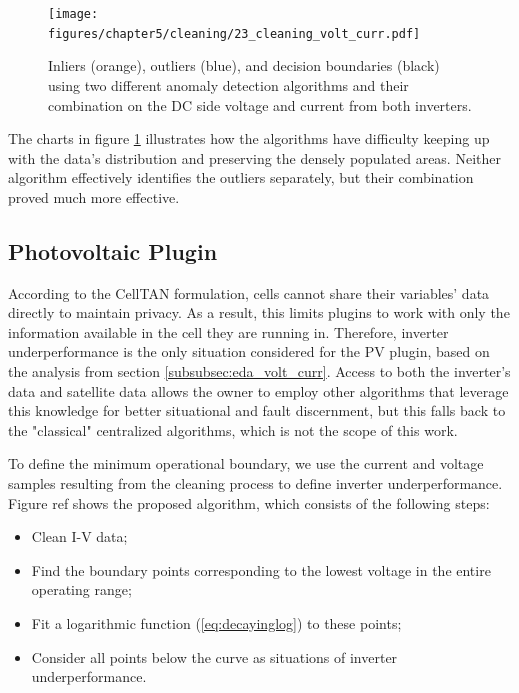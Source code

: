 \begin{figure}[h!]
    \centering
    \texttt{[image: figures/chapter5/cleaning/23\_cleaning\_volt\_curr.pdf]}
    \caption{Inliers (orange), outliers (blue), and decision boundaries (black) using two different anomaly detection algorithms and their combination on the DC side voltage and current from both inverters.}
    \label{fig:clean_volt_curr}
\end{figure}

The charts in figure \ref{fig:clean_volt_curr} illustrates how the algorithms have difficulty keeping up with the data's distribution and preserving the densely populated areas. Neither algorithm effectively identifies the outliers separately, but their combination proved much more effective.

\subsection{Photovoltaic Plugin}

According to the CellTAN formulation, cells cannot share their variables' data directly to maintain privacy. As a result, this limits plugins to work with only the information available in the cell they are running in. Therefore, inverter underperformance is the only situation considered for the PV plugin, based on the analysis from section \ref{subsubsec:eda_volt_curr}. Access to both the inverter's data and satellite data allows the owner to employ other algorithms that leverage this knowledge for better situational and fault discernment, but this falls back to the "classical" centralized algorithms, which is not the scope of this work.


To define the minimum operational boundary, we use the current and voltage samples resulting from the cleaning process to define inverter underperformance. Figure ref shows the proposed algorithm, which consists of the following steps:

\begin{itemize}
	\item Clean I-V data;
	\item Find the boundary points corresponding to the lowest voltage in the entire operating range;
	\item Fit a logarithmic function (\ref{eq:decayinglog}) to these points;
	\item Consider all points below the curve as situations of inverter underperformance.
\end{itemize}


